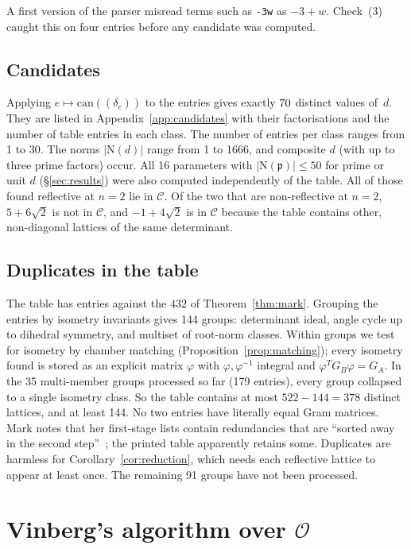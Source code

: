 \documentclass[11pt]{amsart}
\theoremstyle{definition}
\newcommand{\OK}{\mathcal{O}}
\newcommand{\N}{\mathrm{N}}
\begin{document}
A first version of the parser misread terms such as \texttt{-3w} as $-3+w$. Check~(3) caught
this on four entries before any candidate was computed.

\subsection{Candidates}
Applying $e\mapsto\mathrm{can}((\delta_e))$ to the \NEntries{} entries gives exactly
$70$ distinct values of~$d$. They are listed in Appendix~\ref{app:candidates} with
their factorisations and the number of table entries in each class. The number of entries per
class ranges from 1 to 30. The norms $|\N(d)|$ range from 1 to 1666, and composite $d$ (with
up to three prime factors) occur. All 16 parameters with $|\N(\mathfrak p)|\le50$ for prime or
unit $d$ (\S\ref{sec:results}) were also computed independently of the table. All of those
found reflective at $n=2$ lie in $\mathcal C$. Of the two that are non-reflective at $n=2$,
$5+6\sqrt2$ is not in $\mathcal C$, and $-1+4\sqrt2$ is in $\mathcal C$ because the table
contains other, non-diagonal lattices of the same determinant.

\subsection{Duplicates in the table}\label{sec:duplicates}
The table has \NEntries{} entries against the $432$ of Theorem~\ref{thm:mark}. Grouping the
entries by isometry invariants gives 144 groups: determinant ideal, angle cycle up to dihedral
symmetry, and multiset of root-norm classes. Within groups we test for isometry by chamber
matching (Proposition~\ref{prop:matching}); every isometry found is stored as an explicit
matrix $\varphi$ with $\varphi,\varphi^{-1}$ integral and $\varphi^TG_B\varphi=G_A$. In the
35 multi-member groups processed so far (179 entries), every group collapsed to a single
isometry class. So the table contains at most $522-144=378$ distinct lattices, and at least
144. No two entries have literally equal Gram matrices. Mark notes that her first-stage
lists contain redundancies that are ``sorted away in the second step''~\cite{Mar18};
the printed table apparently retains some. Duplicates are harmless for
Corollary~\ref{cor:reduction}, which needs each reflective lattice to appear at least once.
The remaining 91 groups have not been processed.

\section{Vinberg's algorithm over $\OK$}\label{sec:vinberg}
\end{document}
